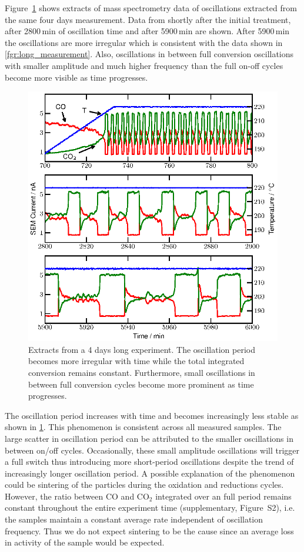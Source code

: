 \documentclass[journal=jacsat,manuscript=article]{achemso}
\begin{document}
Figure~\ref{fgr:extracts} shows extracts of mass spectrometry data of oscillations
extracted from the same four days measurement. Data from shortly after the
initial treatment, after 2800\,min of oscillation time and after 5900\,min are
shown. After 5900\,min the oscillations are more irregular which is consistent
with the data shown in \ref{fgr:long_measurement}. Also, oscillations in
between full conversion oscillations with smaller amplitude and much higher
frequency than the full on-off cycles become more visible as time progresses.
\begin{figure}
  \includegraphics[width=12cm]{extracts_from_very_long_oscillation.eps}
  \caption{Extracts from a 4 days long experiment. The oscillation period
  becomes more irregular with time while the total integrated conversion
  remains constant. Furthermore, small oscillations in between full conversion
  cycles become more prominent as time progresses.} \label{fgr:extracts}
\end{figure}

The oscillation period increases with time and becomes increasingly less stable
as shown in \ref{fgr:extracts}. This phenomenon is consistent across all
measured samples. The large scatter in oscillation period can be attributed to
the smaller oscillations in between on/off cycles. Occasionally, these small
amplitude oscillations will trigger a full switch thus introducing more
short-period oscillations despite the trend of increasingly longer oscillation
period. A possible explanation of the phenomenon could be sintering of the
particles during the oxidation and reductions cycles. However, the ratio
between CO and CO$_2$ integrated over an full period remains constant
throughout the entire experiment time (supplementary, Figure~S2), i.e. the samples maintain a constant
average rate independent of oscillation frequency. Thus we do not expect
sintering to be the cause since an average loss in activity of the sample would
be expected.
\end{document}
